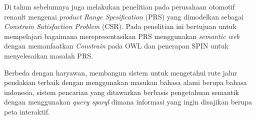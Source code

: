 Di tahun sebelumnya juga \citet{badra} melakukan penelitian pada perusahaan otomotif renault mengenai \emph{product Range Spesification} (PRS) yang dimodelkan sebagai \emph{Constrain Satisfaction Problem} (CSR). Pada penelitian ini bertujuan untuk mempelajari bagaimana merepresentasikan PRS menggunakan \emph{semantic web} dengan memanfaatkan \emph{Constrain} pada OWL dan penerapan SPIN untuk menyelesaikan masalah PRS. 

Berbeda dengan haryawan, \citet{admojo} membangun sistem untuk mengetahui rute jalur pendakian terbaik dengan menggunakan masukan bahasa alami berupa bahasa indonesia, sistem pencarian yang ditawarkan berbasis pengetahuan semantik dengan menggunakan \emph{query sparql} dimana informasi yang ingin disajikan berupa peta interaktif.